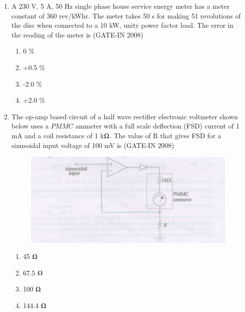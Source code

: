 \documentclass[journal,12pt,onecolumn]{IEEEtran}
\theoremstyle{remark}
\begin{document}
\begin{enumerate}
\item  A 230 V, 5 A, 50 Hz single phase house service energy meter has a meter constant of
360 rev/kWhr. The meter takes 50 s for making 51 revolutions of the disc when connected to a
10 kW, unity power factor load. The error in the reading of the meter is \hfill{(GATE-IN 2008)}
\begin{multicols}{4}
           \begin{enumerate} 
              \item 0 \%          
              \item +0.5 \%
              \item -2.0 \%
              \item +2.0 \%
            \end{enumerate}
            \end{multicols}
 
\item  The op-amp based circuit of a half wave rectifier electronic voltmeter shown below  uses a $PMMC$ 
ammeter with a full scale deflection (FSD) current of 1 mA and a coil resistance of 1 k$\ohm$. The value
of R that gives FSD for a sinusoidal input voltage of 100 mV  is \hfill{(GATE-IN 2008)}
\begin{figure}[H]
    \centering
    \includegraphics[width=0.5\columnwidth]{figs/i24.jpg}
    \caption{}
    \label{fig:placeholder24}
\end{figure}
\begin{multicols}{4}
           \begin{enumerate} 
              \item 45 $\ohm$   
              \item 67.5 $\ohm$
              \item 100 $\ohm$
              \item 144.4 $\ohm$
            \end{enumerate}
            \end{multicols}


\end{enumerate}
\end{document}
